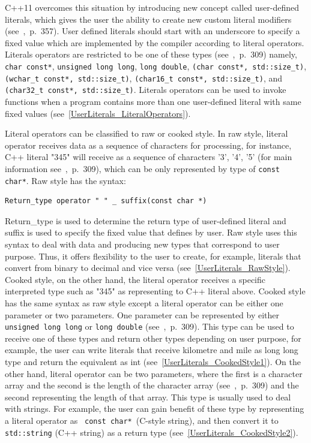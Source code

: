 \documentclass[11pt]{report}
\begin{document}
C++11 overcomes this situation by introducing new concept called user-defined literals, which gives the user the ability to create new custom literal modifiers (see~\cite{Overland:2011:CWF},~p.~357). User defined literals should start with an underscore to specify a fixed value which are implemented by the compiler according to literal operators. Literals operators are restricted to be one of these types (see~\cite{Gregorie:professionalcpp},~p.~309) namely, \texttt{char const*}, \texttt{unsigned long long}, \texttt{long~double}, \texttt{(char~const*,~std::size\_t)}, \texttt{(wchar\_t const*, std::size\_t)},  \texttt{(char16\_t const*, std::size\_t)}, and \texttt{(char32\_t const*, std::size\_t)}. \linebreak Literals operators can be used to invoke functions when a program contains more than one user-defined literal with same fixed values (see~\ref{UserLiterals_LiteralOperators}).

Literal operators can be classified to raw or cooked style. In raw style, literal operator receives data as a sequence of characters for processing, for instance, C++ literal "345" will receive as a sequence of characters '3', '4', '5' (for main information see~\cite{Gregorie:professionalcpp},~p.~309), which can be only represented by type of  \texttt{const char*}. Raw style has the syntax:
\begin{lstlisting}
Return_type operator " " _ suffix(const char *)
\end{lstlisting}
Return\_type is used to determine the return type of user-defined literal and suffix is used to specify the fixed value that defines by user. Raw style uses this syntax to deal with data and producing new types that correspond to user purpose. Thus, it offers flexibility to the user to create, for example, literals that convert from binary to decimal and vice versa (see~\ref{UserLiterals_RawStyle}). Cooked style, on the other hand, the literal operator receives a specific interpreted type such as "345" as representing to C++ literal above. Cooked style has the same syntax as raw style except a literal operator can be either one parameter or two parameters. One parameter can be represented by either \texttt{ unsigned long long} or \texttt{long double} (see~\cite{Gregorie:professionalcpp},~p.~309). This type can be used to receive one of these types and return other types depending on user purpose, for example, the user can write literals that receive kilometre and mile as long long type and return the equivalent as int (see~\ref{UserLiterals_CookedStyle1}). On the other hand, literal operator can be two parameters, where the first is a character array and the second is the length of the character array (see~\cite{Gregorie:professionalcpp},~p.~309) and the second representing the length of that array. This type is usually used to deal with strings. For example, the user can gain benefit of these type by representing a literal operator as \texttt{ const char*}~(C-style string), and then convert it to \texttt{std::string} (C++ string) as a return type (see~\ref{UserLiterals_CookedStyle2}).
\end{document}
